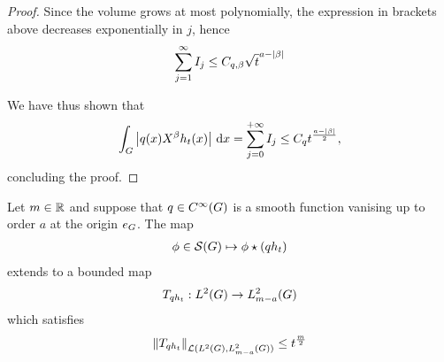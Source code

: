 \begin{proof}
    Since the volume grows at most polynomially,
    the expression in brackets above decreases exponentially in $j$,
    hence
    \begin{align*}
        \sum_{j = 1}^\infty I_j \leq C_{q, \beta} \sqrt t^{a - \abs \beta}
    \end{align*}

    We have thus shown that
    \begin{align*}
        \int_\Group \abs {q(x) \LeftDifferentialOperator \beta h_t(x)} \dd x
        = \sum_{j = 0}^{+\infty} I_j \leq C_q t^{\frac{a - \abs \beta} 2},
    \end{align*}
    concluding the proof.
\end{proof}

\begin{proposition}
    Let $m \in \R$ and suppose that $q \in \SmoothFunctions \Group$ is a smooth function vanising up to order $a$ at the origin $e_\Group$.
    The map
    \begin{align*}
        \phi \in \Schwartz \Group \mapsto \conv \phi {(q h_t)}
    \end{align*}
    extends to a bounded map
    \begin{align*}
        T_{q h_t} : \Lebesgue 2 \Group \to \Sobolev {m - a}
    \end{align*}
    which satisfies
    \begin{align*}
        \norm [\Lin{\Lebesgue 2 \Group, \Sobolev {m - a}}] {T_{q h_t}}
        \leq t^{\frac m 2}
    \end{align*}
\end{proposition}
